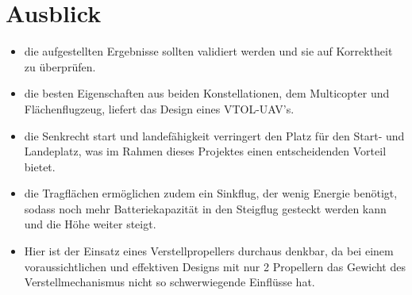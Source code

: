 \section{Ausblick}

\begin{itemize}
	\item die aufgestellten Ergebnisse sollten validiert werden und sie auf Korrektheit zu überprüfen. 
	\item die besten Eigenschaften aus beiden Konstellationen, dem Multicopter und Flächenflugzeug, liefert das Design eines VTOL-UAV's.
	\item die Senkrecht start und landefähigkeit verringert den Platz für den Start- und Landeplatz, was im Rahmen dieses Projektes einen entscheidenden Vorteil bietet. 
	\item die Tragflächen ermöglichen zudem ein Sinkflug, der wenig Energie benötigt, sodass noch mehr Batteriekapazität in den Steigflug gesteckt werden kann und die Höhe weiter steigt. 
	\item Hier ist der Einsatz eines Verstellpropellers durchaus denkbar, da bei einem voraussichtlichen und effektiven Designs mit nur 2 Propellern das Gewicht des Verstellmechanismus nicht so schwerwiegende Einflüsse hat.
\end{itemize}